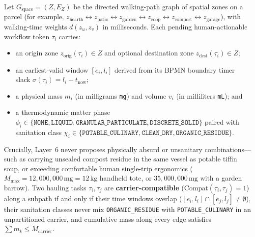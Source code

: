 Let $G_{\mathrm{space}} = (Z, E_Z)$ be the directed walking-path graph of spatial zones on a parcel (for example, $z_{\mathrm{hearth}} \leftrightarrow z_{\mathrm{patio}} \leftrightarrow z_{\mathrm{garden}} \leftrightarrow z_{\mathrm{coop}} \leftrightarrow z_{\mathrm{compost}} \leftrightarrow z_{\mathrm{garage}}$), with walking-time weights $d(z_u, z_v)$ in milliseconds. Each pending human-actionable workflow token $\tau_i$ carries:
\begin{itemize}
    \item an origin zone $z_{\mathrm{orig}}(\tau_i) \in Z$ and optional destination zone $z_{\mathrm{dest}}(\tau_i) \in Z$;
    \item an earliest-valid window $[e_i, l_i]$ derived from its BPMN boundary timer slack $\sigma(\tau_i) = l_i - t_{\mathrm{now}}$;
    \item a physical mass $m_i$ (in milligrams \texttt{mg}) and volume $v_i$ (in milliliters \texttt{mL}); and
    \item a thermodynamic matter phase $\phi_i \in \{\texttt{NONE}, \texttt{LIQUID}, \texttt{GRANULAR\_PARTICULATE}, \texttt{DISCRETE\_SOLID}\}$ paired with sanitation class $\chi_i \in \{\texttt{POTABLE\_CULINARY}, \texttt{CLEAN\_DRY}, \texttt{ORGANIC\_RESIDUE}\}$.
\end{itemize}

Crucially, Layer~6 never proposes physically absurd or unsanitary combinations---such as carrying unsealed compost residue in the same vessel as potable tiffin soup, or exceeding comfortable human single-trip ergonomics ($M_{\max} = 12{,}000{,}000\,\mathrm{mg} = 12\,\mathrm{kg}$ handheld tote, or $35{,}000{,}000\,\mathrm{mg}$ with a garden barrow). Two hauling tasks $\tau_i, \tau_j$ are \textbf{carrier-compatible} ($\mathrm{Compat}(\tau_i, \tau_j) = 1$) along a subpath if and only if their time windows overlap ($[e_i, l_i] \cap [e_j, l_j] \neq \emptyset$), their sanitation classes never mix \texttt{ORGANIC\_RESIDUE} with \texttt{POTABLE\_CULINARY} in an unpartitioned carrier, and cumulative mass along every edge satisfies $\sum m_k \le M_{\mathrm{carrier}}$.

